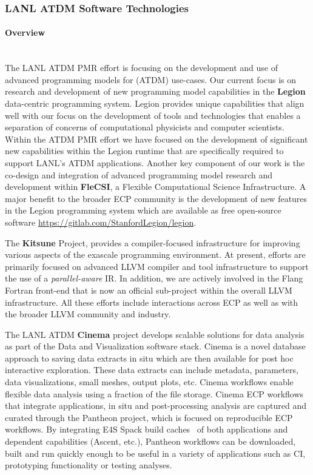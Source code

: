 \subsubsection{ LANL ATDM Software Technologies}

\paragraph{Overview} \leavevmode \\

The LANL ATDM PMR effort is focusing on the development and use of
advanced programming models for (ATDM) use-cases. Our current focus is on research and development
of new programming model capabilities in the \textbf{Legion} data-centric
programming system. Legion provides unique capabilities that align
well with our focus on the development of tools and technologies that
enables a separation of concerns of computational physicists and
computer scientists. Within the ATDM PMR effort we have focused on the
development of significant new capabilities within the Legion runtime
that are specifically required to support LANL's ATDM
applications. Another key component of our work is the co-design and
integration of advanced programming model research and development
within \textbf{FleCSI}, a Flexible Computational Science Infrastructure. A
major benefit to the broader ECP community is the development of new 
features in the Legion programming system which are available as free
open-source software \url{https://gitlab.com/StanfordLegion/legion}.  

The \textbf{Kitsune} Project, provides a compiler-focused infrastructure
for improving various aspects of the exascale programming environment.
At present, efforts are primarily focused on advanced LLVM compiler and
tool infrastructure to support the use of a \emph{parallel-aware} IR.
In addition, we are actively involved in the Flang Fortran
front-end that is now an official sub-project within the overall LLVM
infrastructure. All these efforts include interactions across ECP as well as
with the broader LLVM community and industry.  


The LANL ATDM \textbf{Cinema} project develops scalable solutions for data analysis as part of the Data and Visualization software stack.
Cinema is a novel database approach to saving data extracts in situ which are then available for post hoc interactive exploration.  These data extracts can include metadata, parameters, data visualizations, small meshes, output plots, etc.  Cinema workflows enable flexible data analysis using a fraction of the file storage.  Cinema ECP workflows that integrate applications, in situ and post-processing analysis are captured and curated through the Pantheon project, which is focused on reproducible ECP workflows.  By integrating E4S Spack build caches~\cite{e4s:builds} of both applications and dependent capabilities (Ascent, etc.), Pantheon workflows can be downloaded, built and run quickly enough to be useful in a variety of applications such as CI, prototyping functionality or testing analyses.  

